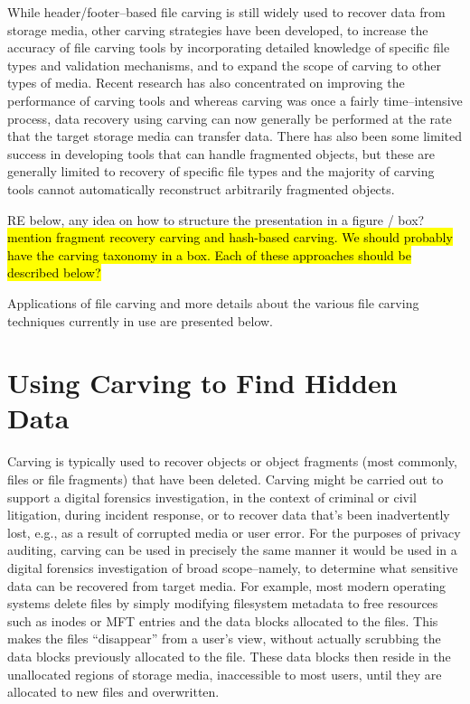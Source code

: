 While header/footer--based file carving is still widely used to
recover data from storage media, other carving strategies have been
developed, to increase the accuracy of file carving tools by
incorporating detailed knowledge of specific file types and validation
mechanisms, and to expand the scope of carving to other types of
media.  Recent research has also concentrated on improving the
performance of carving tools and whereas carving was once a fairly
time--intensive process, data recovery using carving can now generally
be performed at the rate that the target storage media can transfer
data.  There has also been some limited success in developing tools
that can handle fragmented objects, but these are generally limited to
recovery of specific file types and the majority of carving tools
cannot automatically reconstruct arbitrarily fragmented
objects. 

\color{red}

RE below, any idea on how to structure the presentation in a figure / box?
\hl{mention fragment recovery carving and hash-based carving. We should probably have the
  carving taxonomy in a box. Each of these approaches should be
  described below?}
\color{black}

Applications of file carving and more details about the various file carving techniques currently in use are presented below.

\section{Using Carving to Find Hidden Data}

Carving is typically used to recover objects or object fragments (most
commonly, files or file fragments) that have been deleted.  Carving
might be carried out to support a digital forensics investigation, in
the context of criminal or civil litigation, during incident response,
or to recover data that's been inadvertently lost, e.g., as a result
of corrupted media or user error.  For the purposes of privacy
auditing, carving can be used in precisely the same manner it would be
used in a digital forensics investigation of broad scope--namely, to
determine what sensitive data can be recovered from target media.  For
example, most modern operating systems delete files by simply
modifying filesystem metadata to free resources such as inodes or MFT
entries and the data blocks allocated to the files.  This makes the
files ``disappear'' from a user's view, without actually scrubbing the
data blocks previously allocated to the file.  These data blocks then
reside in the unallocated regions of storage media, inaccessible to
most users, until they are allocated to new files and overwritten.

